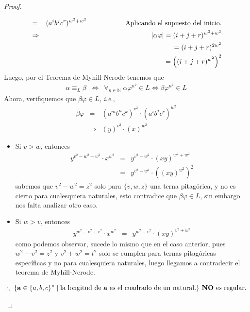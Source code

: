 \documentclass{article}
\begin{document}
\begin{enumerate}
\begin{proof}
\begin{itemize}
\begin{eqnarray*}
        &=& (a^{i}b^{j}c^{r})^{w^2 + w^2}
        \hspace*{2cm} \text{Aplicando el supuesto del inicio.}\\
        &\Rightarrow& |\alpha \varphi| = (i + j + r)^{w^2 + w^2}\\
        & & \hspace*{0.75cm} = (i + j + r)^{2w^2}\\
        & & \hspace*{0.75cm} = \left((i + j + r)^{w^2}\right)^{2}
      \end{eqnarray*}
      Luego, por el Teorema de Myhill-Nerode tenemos que
      \begin{eqnarray*}
      \alpha \equiv_{L} \beta &\Leftrightarrow& \forall_{n \in \mathbb{N}}\; \alpha \varphi^{n^2} \in L
      \Leftrightarrow \beta \varphi^{n^2} \in L
      \end{eqnarray*}
      Ahora, verifiquemos que $\beta \varphi \in L$, \textit{i.e.},
      \begin{eqnarray*}
        \beta \varphi &=& (a^{m}b^{n}c^{k})^{v^2} \cdot (a^{i}b^{j}c^{r})^{w^2}\\
        &\Rightarrow& (y)^{v^2} \cdot (x)^{w^2} 
      \end{eqnarray*}
      \begin{itemize}
      \item Si $v > w$, entonces
        \begin{eqnarray*}
          y^{v^2 - w^2 + w^2} \cdot x^{w^2} &=& y^{v^2 - w^2} \cdot (xy)^{w^2 + w^2}\\
          &=& y^{v^2 - w^2} \cdot \left((xy)^{w^2}\right)^2
        \end{eqnarray*}
        sabemos que $v^2 - w^2 = z^2$ solo para $\{v,w,z\}$ una terna pitagórica, y no es
        cierto para cualesquiera naturales, esto contradice que $\beta \varphi \in L$, sin
        embargo nos falta analizar otro caso.
      \item Si $w > v$, entonces
        \begin{eqnarray*}
          y^{w^2 - v^2 + v^2} \cdot x^{w^2} &=& y^{w^2 - v^2} \cdot (xy)^{v^2 + w^2}
        \end{eqnarray*}
        como podemos observar, sucede lo mismo que en el caso anterior, pues
        $w^2 - v^2 = z^2$ y $v^2 + w^2 = t^2$ solo se cumplen para ternas pitagóricas específicas
        y no para cualesquiera naturales, luego llegamos a contradecir el teorema de
        Myhill-Nerode.
      \end{itemize}
      \[
      \therefore\; \{\mathbf{a} \in \{a, b, c\}^{*}\; |\; \text{la longitud de $\mathbf{a}$
        es el cuadrado de un natural.}\} \text{ \textbf{NO} es regular}.
      \]
    \end{itemize}


\end{proof}
\end{enumerate}
\end{document}

